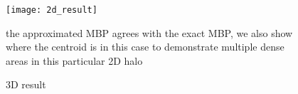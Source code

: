 \begin{figure}[ht]
\centering
    \texttt{[image: 2d\_result]}
    \caption{the approximated MBP agrees with the exact MBP, we also show where the centroid is in this case to demonstrate multiple dense areas in this particular 2D halo}
    \label{2d_result}
\end{figure}

\begin{figure}[h]
\hfill
{}
\caption{3D result}
\label{3dresult}
\end{figure}

% 
